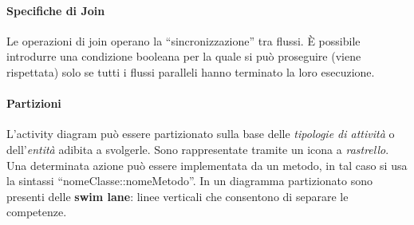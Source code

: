 \begin{figure}[h!]
    \hfill
\end{figure}

\paragraph{Specifiche di Join} Le operazioni di join operano la “sincronizzazione” tra flussi. È possibile introdurre una condizione booleana per la quale si può proseguire (viene rispettata) solo se tutti i flussi paralleli hanno terminato la loro esecuzione.

\paragraph{Partizioni} L'activity diagram può essere partizionato sulla base delle \textit{tipologie di attività} o dell'\textit{entità} adibita a svolgerle. Sono rappresentate tramite un icona a \textit{rastrello}. Una determinata azione può essere implementata da un metodo, in tal caso si usa la sintassi “nomeClasse::nomeMetodo”. In un diagramma partizionato sono presenti delle \textbf{swim lane}: linee verticali che consentono di separare le competenze.

